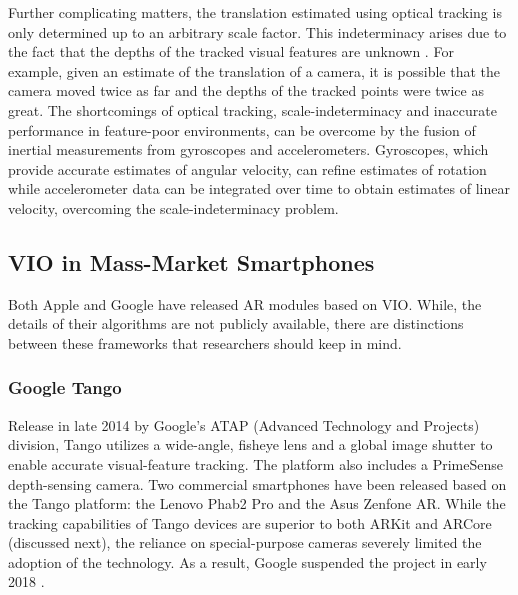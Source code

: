 \documentclass[chi_draft]{sigchi}
\begin{document}
Further complicating matters, the translation estimated using optical tracking is only determined up to an arbitrary scale factor.  This indeterminacy arises due to the fact that the depths of the tracked visual features are unknown \cite{Hartley2004}.  For example, given an estimate of the translation of a camera, it is possible that the camera moved twice as far and the depths of the tracked points were twice as great.  The shortcomings of optical tracking, scale-indeterminacy and inaccurate performance in feature-poor environments, can be overcome by the fusion of inertial measurements from gyroscopes and accelerometers.  Gyroscopes, which provide accurate estimates of angular velocity, can refine estimates of rotation while accelerometer data can be integrated over time to obtain estimates of linear velocity, overcoming the scale-indeterminacy problem.

\subsection{VIO in Mass-Market Smartphones}
Both Apple and Google have released AR modules based on VIO.  While, the details of their algorithms are not publicly available, there are distinctions between these frameworks that researchers should keep in mind.

\subsubsection{Google Tango}
Release in late 2014 by Google's ATAP (Advanced Technology and Projects) division, Tango utilizes a wide-angle, fisheye lens and a global image shutter to enable accurate visual-feature tracking.  The platform also includes a PrimeSense depth-sensing camera.  Two commercial smartphones have been released based on the Tango platform: the Lenovo Phab2 Pro and the Asus Zenfone AR.  While the tracking capabilities of Tango devices are superior to both ARKit and ARCore (discussed next), the reliance on special-purpose cameras severely limited the adoption of the technology.  As a result, Google suspended the project in early 2018 \cite{tangoretired}.
\end{document}
